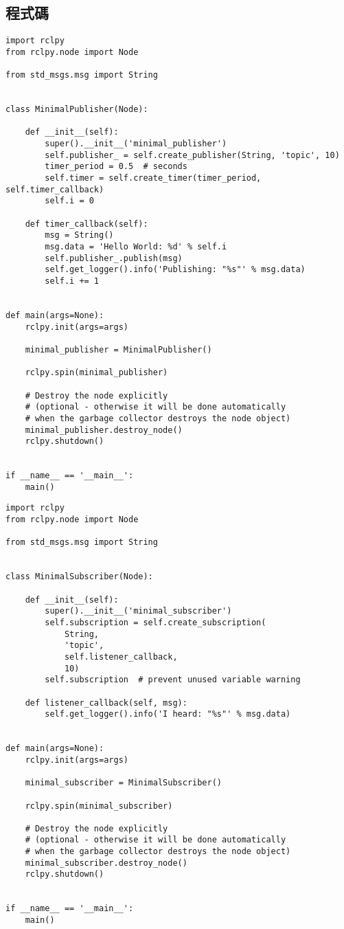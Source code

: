 \subsection{程式碼}
\begin{verbatim}
import rclpy
from rclpy.node import Node

from std_msgs.msg import String


class MinimalPublisher(Node):

    def __init__(self):
        super().__init__('minimal_publisher')
        self.publisher_ = self.create_publisher(String, 'topic', 10)
        timer_period = 0.5  # seconds
        self.timer = self.create_timer(timer_period, self.timer_callback)
        self.i = 0

    def timer_callback(self):
        msg = String()
        msg.data = 'Hello World: %d' % self.i
        self.publisher_.publish(msg)
        self.get_logger().info('Publishing: "%s"' % msg.data)
        self.i += 1


def main(args=None):
    rclpy.init(args=args)

    minimal_publisher = MinimalPublisher()

    rclpy.spin(minimal_publisher)

    # Destroy the node explicitly
    # (optional - otherwise it will be done automatically
    # when the garbage collector destroys the node object)
    minimal_publisher.destroy_node()
    rclpy.shutdown()


if __name__ == '__main__':
    main()
\end{verbatim}
\begin{verbatim}
import rclpy
from rclpy.node import Node

from std_msgs.msg import String


class MinimalSubscriber(Node):

    def __init__(self):
        super().__init__('minimal_subscriber')
        self.subscription = self.create_subscription(
            String,
            'topic',
            self.listener_callback,
            10)
        self.subscription  # prevent unused variable warning

    def listener_callback(self, msg):
        self.get_logger().info('I heard: "%s"' % msg.data)


def main(args=None):
    rclpy.init(args=args)

    minimal_subscriber = MinimalSubscriber()

    rclpy.spin(minimal_subscriber)

    # Destroy the node explicitly
    # (optional - otherwise it will be done automatically
    # when the garbage collector destroys the node object)
    minimal_subscriber.destroy_node()
    rclpy.shutdown()


if __name__ == '__main__':
    main()
\end{verbatim}
